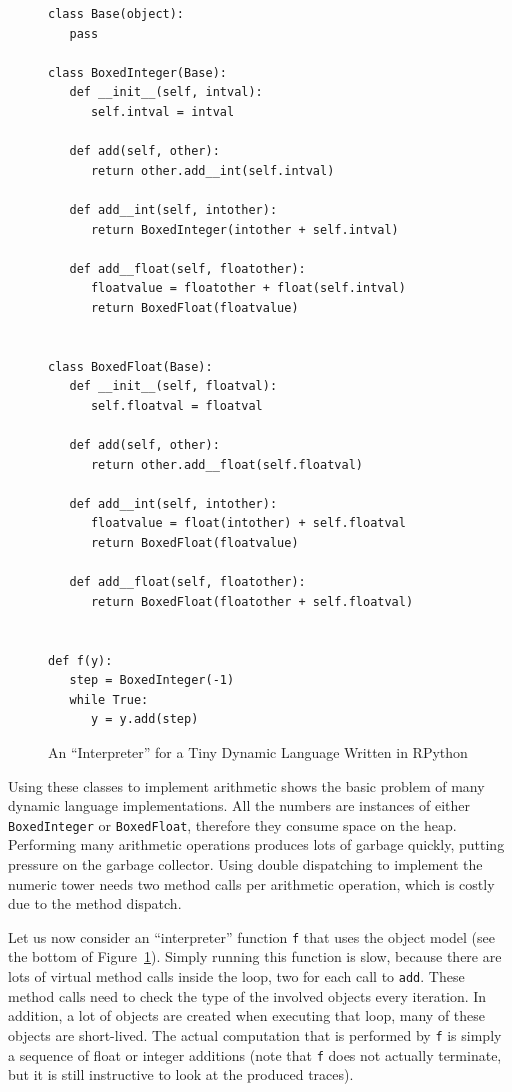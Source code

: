 \documentclass[preprint]{sigplanconf}
\begin{document}
\begin{figure}
\begin{lstlisting}[mathescape,basicstyle=\setstretch{1.05}\ttfamily\scriptsize]
class Base(object):
   pass

class BoxedInteger(Base):
   def __init__(self, intval):
      self.intval = intval

   def add(self, other):
      return other.add__int(self.intval)

   def add__int(self, intother):
      return BoxedInteger(intother + self.intval)

   def add__float(self, floatother):
      floatvalue = floatother + float(self.intval)
      return BoxedFloat(floatvalue)


class BoxedFloat(Base):
   def __init__(self, floatval):
      self.floatval = floatval

   def add(self, other):
      return other.add__float(self.floatval)

   def add__int(self, intother):
      floatvalue = float(intother) + self.floatval
      return BoxedFloat(floatvalue)

   def add__float(self, floatother):
      return BoxedFloat(floatother + self.floatval)


def f(y):
   step = BoxedInteger(-1)
   while True:
      y = y.add(step)
\end{lstlisting}
\caption{An ``Interpreter'' for a Tiny Dynamic Language Written in RPython}
\label{fig:objmodel}
\end{figure}

Using these classes to implement arithmetic shows the basic problem of many
dynamic language implementations. All the numbers are instances of either
\lstinline{BoxedInteger} or \lstinline{BoxedFloat}, therefore they consume space on the
heap. Performing many arithmetic operations produces lots of garbage quickly,
putting pressure on the garbage collector. Using double dispatching to
implement the numeric tower needs two method calls per arithmetic operation,
which is costly due to the method dispatch.

Let us now consider an ``interpreter'' function \lstinline{f} that uses the
object model (see the bottom of Figure~\ref{fig:objmodel}).
Simply running this function is slow, because there are lots of virtual method
calls inside the loop, two for each
call to \lstinline{add}. These method calls need to check the type of the involved
objects every iteration. In addition, a lot of objects are created
when executing that loop, many of these objects are short-lived.
The actual computation that is performed by \lstinline{f} is simply a sequence of
float or integer additions (note that \lstinline{f} does not actually terminate,
but it is still instructive to look at the produced traces).
\end{document}
